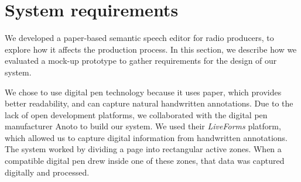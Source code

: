 




\section{System requirements}\label{sec:paper-requirements}

We developed a paper-based semantic speech editor for radio producers, to explore how it affects the production
process.  In this section, we describe how we evaluated a mock-up prototype to gather requirements for the design of
our system.

We chose to use digital pen technology because it uses paper, which provides better readability, and can capture
natural handwritten annotations.  Due to the lack of open development platforms, we collaborated with the digital pen
manufacturer Anoto to build our system.  We used their \textit{Live\texttrademark Forms} platform, which allowed us to
capture digital information from handwritten annotations.  The system worked by dividing a page into rectangular active
zones. When a compatible digital pen drew inside one of these zones, that data was captured digitally and processed.


